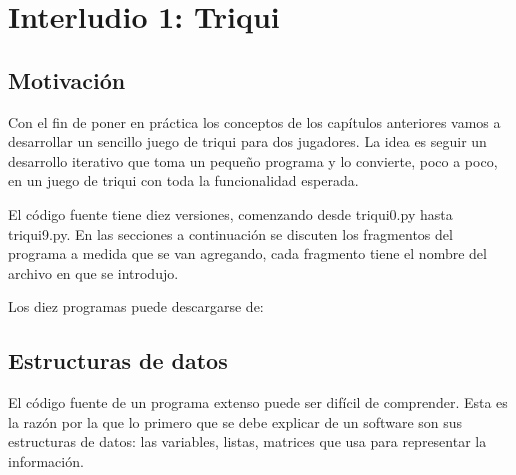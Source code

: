 


\chapter{Interludio 1: Triqui}
\label{cap:inter1:triqui}



\section{Motivación}

Con el fin de poner en práctica los conceptos de los capítulos anteriores
vamos a desarrollar un sencillo juego de triqui para dos jugadores. La idea
es seguir un desarrollo iterativo que toma un pequeño programa y lo convierte,
poco a poco, en un juego de triqui con toda la funcionalidad esperada.

El código fuente tiene diez versiones, comenzando desde triqui0.py hasta
triqui9.py. En las secciones a continuación se discuten los fragmentos del 
programa a medida que se van agregando, cada fragmento tiene el nombre del 
archivo en que se introdujo.

Los diez programas puede descargarse de:


\section{Estructuras de datos}

El código fuente de un programa extenso puede ser difícil de comprender. Esta es
la razón por la que lo primero que se debe explicar de un software son sus 
estructuras de datos: las variables, listas, matrices que usa para representar
la información. 

